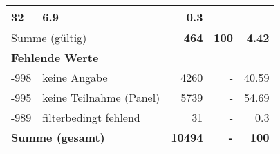 \begin{longtable}{lXrrr}
       \num{32} &
       \num[round-mode=places,round-precision=2]{6,9} &
         \num[round-mode=places,round-precision=2]{0,3} \\
     \midrule
     \multicolumn{2}{l}{Summe (gültig)} &
       \textbf{\num{464}} &
     \textbf{100} &
       \textbf{\num[round-mode=places,round-precision=2]{4,42}} \\
     \multicolumn{5}{l}{\textbf{Fehlende Werte}}\\
       -998 &
       keine Angabe &
         \num{4260} &
        - &
         \num[round-mode=places,round-precision=2]{40,59} \\
       -995 &
       keine Teilnahme (Panel) &
         \num{5739} &
        - &
         \num[round-mode=places,round-precision=2]{54,69} \\
       -989 &
       filterbedingt fehlend &
         \num{31} &
        - &
         \num[round-mode=places,round-precision=2]{0,3} \\
     \midrule
     \multicolumn{2}{l}{\textbf{Summe (gesamt)}} &
          \textbf{\num{10494}} &
        \textbf{-} &
        \textbf{100} \\
     \bottomrule
     \end{longtable}
     
